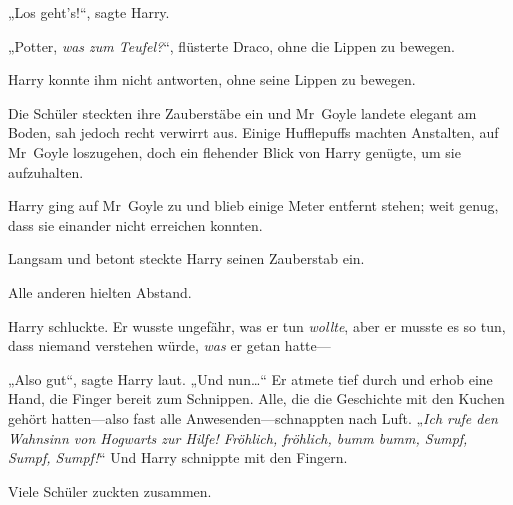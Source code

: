 „Los geht’s!“, sagte Harry.

„Potter, \emph{was zum Teufel?}“, flüsterte Draco, ohne die Lippen zu bewegen.

Harry konnte ihm nicht antworten, ohne seine Lippen zu bewegen.

Die Schüler steckten ihre Zauberstäbe ein und Mr~Goyle landete elegant am Boden, sah jedoch recht verwirrt aus. Einige Hufflepuffs machten Anstalten, auf Mr~Goyle loszugehen, doch ein flehender Blick von Harry genügte, um sie aufzuhalten.

Harry ging auf Mr~Goyle zu und blieb einige Meter entfernt stehen; weit genug, dass sie einander nicht erreichen konnten.

Langsam und betont steckte Harry seinen Zauberstab ein.

Alle anderen hielten Abstand.

Harry schluckte. Er wusste ungefähr, was er tun \emph{wollte}, aber er musste es so tun, dass niemand verstehen würde, \emph{was} er getan hatte—

„Also gut“, sagte Harry laut. „Und nun…“ Er atmete tief durch und erhob eine Hand, die Finger bereit zum Schnippen. Alle, die die Geschichte mit den Kuchen gehört hatten—also fast alle Anwesenden—schnappten nach Luft. „\emph{Ich rufe den Wahnsinn von Hogwarts zur Hilfe! Fröhlich, fröhlich, bumm bumm, Sumpf, Sumpf, Sumpf!}“ Und Harry schnippte mit den Fingern.

Viele Schüler zuckten zusammen.

